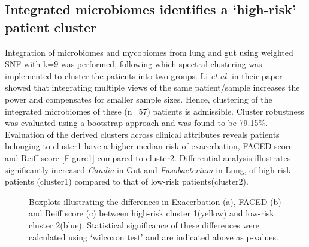 \subsection{Integrated microbiomes identifies a `high-risk' patient cluster}
Integration of microbiomes and mycobiomes from lung and gut using weighted SNF with k=9 was performed, following which spectral clustering was implemented to cluster the patients into two groups. Li \emph{et.al.} in their paper showed that integrating multiple views of the same patient/sample increases the power and compensates for smaller sample sizes\cite{Li2018}. Hence, clustering of the integrated microbiomes of these (n=57) patients is admissible. Cluster robustness was evaluated using a bootstrap approach and was found to be 79.15\%. Evaluation of the derived clusters across clinical attributes reveals patients belonging to cluster1 have a higher median risk of exacerbation, FACED score and Reiff score [Figure\ref{res2_fig4}] compared to cluster2. Differential analysis illustrates significantly increased \emph{Candia} in Gut and \emph{Fusobacterium} in Lung, of high-risk patients (cluster1) compared to that of low-risk patients(cluster2).

\begin{figure}[h]
	\centering
	\caption{Boxplots illustrating the differences in Exacerbation (a), FACED (b) and Reiff score (c) between high-risk cluster 1(yellow) and low-risk cluster 2(blue). Statistical significance of these differences were calculated using ‘wilcoxon test’ and are indicated above as p-values.}
	\label{res2_fig4}
\end{figure}

